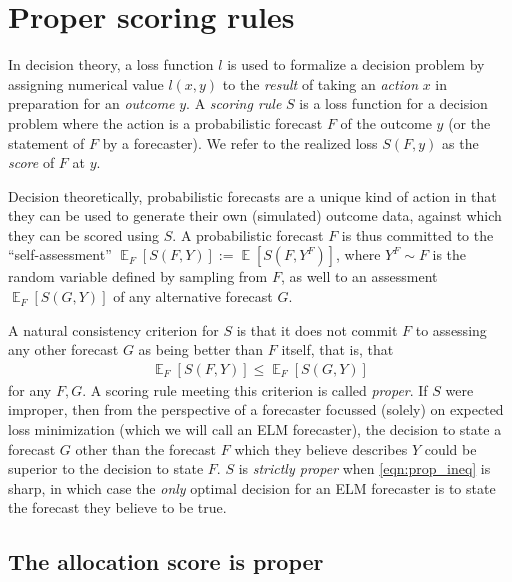 \documentclass{article}
\DeclareMathOperator{\Ex}{\mathbb{E}}
\begin{document}
\section{Proper scoring rules}
\label{sec:proper}

In decision theory, a loss function $l$ is used to formalize a decision problem by assigning numerical value $l(x,y)$ to the 
\emph{result} of taking an \emph{action} $x$ in preparation for an \emph{outcome} $y$. A \emph{scoring rule} $S$ is a 
loss function for a decision problem where the action is a probabilistic forecast $F$ of the outcome $y$ (or the statement of $F$ by a forecaster). 
We refer to the realized loss $S(F,y)$ as the \emph{score} of $F$ at $y$.

Decision theoretically, probabilistic forecasts are a unique kind of action in that they can be used to generate their
own (simulated) outcome data, against which they can be scored using $S$. A probabilistic forecast
$F$ is thus committed to the ``self-assessment'' $\Ex_F [S(F, Y)] := \Ex [S(F, Y^F)]$, where $Y^F \sim F$ is the random variable defined 
by sampling from $F$, as well to an assessment $\Ex_F [S(G, Y)]$ of any alternative forecast $G$.

A natural consistency criterion for $S$ is that it does not commit $F$ to assessing any other forecast $G$ 
as being better than $F$ itself, that is, that
\begin{align}
\Ex_F [S(F, Y)] \leq \Ex_F [S(G, Y)] \label{eqn:prop_ineq}
\end{align} 
for any $F,G$. A scoring rule meeting this criterion is called \emph{proper}. If $S$ were improper, then from the perspective of 
a forecaster focussed (solely) on expected loss minimization (which we will call an ELM forecaster), the decision to state 
a forecast $G$ other than the forecast $F$ which they believe describes $Y$ could be superior to the decision to state $F$. 
$S$ is \emph{strictly proper} when 
\eqref{eqn:prop_ineq} is sharp, in which case the 
\emph{only} optimal decision for an ELM forecaster is to state the forecast they believe to be true.

\subsection{The allocation score is proper}
\label{sec:alloscore_proper}
\end{document}
